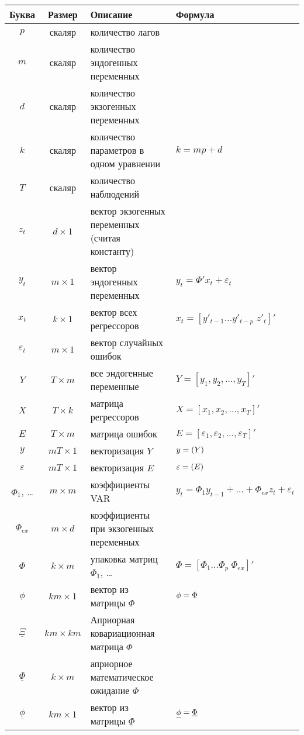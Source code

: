 \documentclass[11pt]{article} %
\newcommand{\prior}{\underline}
\let\vec\relax
\DeclareMathOperator{\vec}{vec}
\begin{document}
\begin{center}
\begin{tabular}{ccp{6cm}l}
\toprule
Буква & Размер &  Описание & Формула \\
\midrule
$p$ & скаляр & количество лагов & \\
$m$ & скаляр & количество эндогенных переменных & \\
$d$ & скаляр & количество экзогенных переменных & \\
$k$ & скаляр & количество параметров в одном уравнении & $k=mp+d$ \\
$T$ & скаляр & количество наблюдений &  \\
\midrule
$z_t$ & $d \times 1$ & вектор экзогенных переменных (считая константу) & \\
$y_t$ & $m \times 1$ & вектор эндогенных переменных  & $y_t=\Phi' x_t+\varepsilon_t$ \\
$x_t$ & $k \times 1$ & вектор всех регрессоров & $x_t=[ y'_{t-1} \ldots  y'_{t-p} \; z'_t ]'$ \\
$\varepsilon_t$ & $m \times 1$ & вектор случайных ошибок  & \\
$Y$ & $T \times m$ & все эндогенные переменные & $Y=[y_1, y_2,\ldots, y_T]'$ \\
$X$ & $T \times k$ & матрица регрессоров& $X=[x_1, x_2,\ldots, x_T]'$ \\
$E$ & $T \times m$ & матрица ошибок & $E=[\varepsilon_1, \varepsilon_2,\ldots, \varepsilon_T]'$ \\
$y$&$mT\times 1$& векторизация $Y$&$y=\vec(Y)$\\
$\varepsilon$&$mT\times 1$ &векторизация $E$&$\varepsilon=\vec(E)$\\
\midrule
$\Phi_1$, \ldots & $m \times m$ & коэффициенты VAR & $y_t= \Phi_1 y_{t-1} + \ldots + \Phi_{ex} z_t +\varepsilon_t$ \\
$\Phi_{ex}$ & $m \times d$ & коэффициенты при экзогенных переменных & \\
$\Phi$ & $k \times m$ & упаковка матриц $\Phi_1$, \ldots & $\Phi=[ \Phi_1 \ldots \Phi_p \; \Phi_{ex}]'$ \\
$\phi$ & $km \times 1$ & вектор из матрицы $\Phi$ & $\phi = \vec{\Phi}$ \\
\midrule %
$\prior \Xi $ & $km \times km$  & Априорная ковариационная матрица $\Phi$& \\
$\prior \Phi$ & $k \times m$ & априорное математическое ожидание $\Phi$ & \\
$\prior \phi$ & $km \times 1$ & вектор из матрицы $\prior \Phi$  & $\prior \phi = \vec{ \prior \Phi}$ \\

\end{tabular}
\end{center}
\end{document}
